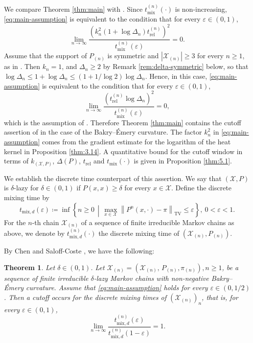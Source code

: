 \documentclass[a4paper, reqno, 11pt]{amsart}
\newtheorem{Thm}{Theorem}[section]
\theoremstyle{definition}
\begin{document}
We compare Theorem \ref{thm:main} with \cite[Theorem 1]{Salez2024}.
Since $t_{\mathrm{mix}}^{(n)}(\cdot)$ is non-increasing, \eqref{eq:main-assumption} is equivalent to the condition that for every $\varepsilon \in (0,1)$,
\[ \lim_{n \to \infty} \frac{\left(k_n^{2}\left(1+\log \Delta_n\right) t_{\mathrm{rel}}^{(n)}\right)^{2}}{t_{\mathrm{mix}}^{(n)}(\varepsilon)} = 0. \]
Assume that the support of $P_{(n)}$ is symmetric and $|\mathcal{X}_{(n)}| \ge 3$ for every $n \ge 1$, as in \cite{Salez2024}.
Then $k_n = 1$, and $\Delta_n \ge 2$ by Remark \ref{rem:delta-symmetric} below, so that $\log \Delta_n \le 1 + \log \Delta_n \le \left(1 + 1/\log 2\right) \log \Delta_n$.
Hence, in this case, \eqref{eq:main-assumption} is equivalent to the condition that for every $\varepsilon \in (0,1)$,
\[ \lim_{n \to \infty} \frac{\left(t_{\mathrm{rel}}^{(n)} \log \Delta_n\right)^{2}}{t_{\mathrm{mix}}^{(n)}(\varepsilon)} = 0, \]
which is the assumption of \cite[Theorem 1]{Salez2024}.
Therefore Theorem \ref{thm:main} contains the cutoff assertion of \cite[Theorem 1]{Salez2024} in the case of the Bakry--\'Emery curvature.
The factor $k_n^{2}$ in \eqref{eq:main-assumption} comes from the gradient estimate for the logarithm of the heat kernel in Proposition \ref{thm:3.14}.
A quantitative bound for the cutoff window in terms of $k_{(\mathcal{X}, P)}$, $\Delta(P)$, $t_{\mathrm{rel}}$ and $t_{\mathrm{mix}}(\cdot)$ is given in Proposition \ref{thm:5.1}.

We establish the discrete time counterpart of this assertion.
We say that $(\mathcal{X}, P)$ is $\delta$-lazy for $\delta \in (0,1)$ if $P(x,x) \ge \delta$ for every $x \in \mathcal{X}$. 
Define the discrete mixing time by 
\[ t_{\mathrm{mix}, d}(\varepsilon) \coloneqq  \inf\left\{n \ge 0 \,\middle|\, \max_{x\in\mathcal{X}} \left\|P^n (x,\cdot)-\pi\right\|_{\mathrm{TV}} \le \varepsilon\right\}, \ 0 < \varepsilon < 1.\]
For the $n$-th chain $\mathcal{X}_{(n)}$ of a sequence of finite irreducible Markov chains as above,
we denote by $t_{\mathrm{mix},d}^{(n)}(\cdot)$ the discrete mixing time of $(\mathcal{X}_{(n)}, P_{(n)})$.

By Chen and Saloff-Coste \cite[Theorem 3.1]{CSC2013},
we have the following:
\begin{Thm}\label{thm:discrete}
Let $\delta \in (0,1)$.
Let $\mathcal{X}_{(n)} = \left(\mathcal{X}_{(n)},\,P_{(n)},\pi_{(n)}\right), n \ge 1$, be a sequence of finite irreducible $\delta$-lazy Markov chains with non-negative Bakry--\'Emery curvature.
Assume that \eqref{eq:main-assumption} holds for every $\varepsilon \in \left(0,1/2\right)$.
Then a cutoff occurs for the discrete mixing times of $\left(\mathcal{X}_{(n)} \right)_n$, that is, for every $\varepsilon \in (0,1)$,
\[ \lim_{n\to\infty} \frac{t_{\mathrm{mix},d}^{(n)}(\varepsilon)}{t_{\mathrm{mix},d}^{(n)}(1-\varepsilon)} = 1. \]
\end{Thm}
\end{document}
